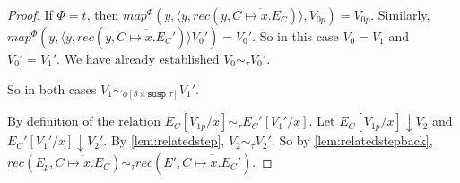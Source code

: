 \begin{proof}
  If $\Phi = t$, then $map^\Phi(y, \langle y, rec(y, \overline{C \mapsto x.E_C})\rangle, V_{0p}) = V_{0p}$.
  Similarly, $map^\Phi(y, \langle y, rec(y, \overline{C \mapsto x.E_C'})\rangle V_0') = V_0'$.
  So in this case $V_0 = V_1$ and $V_0' = V_1'$.
  We have already established $V_0 \sim_\tau V_0'$.

  So in both cases $V_1 \sim_{\phi[\delta \times \texttt{susp }\tau]} V_1'$.

  By definition of the relation $E_C[V_{1p}/x] \sim_\tau E_C'[V_1'/x]$.
  Let $E_C[V_{1p}/x] \downarrow V_2$ and $E_C'[V_1'/x] \downarrow V_2'$.
  By \ref{lem:relatedstep}, $V_2 \sim_\tau V_2'$.
  So by \ref{lem:relatedstepback}, $rec(E_p, \overline{C \mapsto x.E_C}) \sim_\tau rec(E', \overline{C \mapsto x.E_C'})$.
\end{proof}


